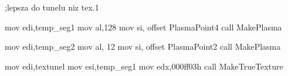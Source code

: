 ;lepsza do tunelu niz tex.1

	mov   edi,temp_seg1
	mov   al,128
	mov   si, offset PlasmaPoint4
	call  MakePlasma

	mov   edi,temp_seg2
	mov   al, 12
	mov   si, offset PlasmaPoint2
	call  MakePlasma

	mov   edi,textunel
	mov   esi,temp_seg1
	mov   edx,000ff03h
	call  MakeTrueTexture

